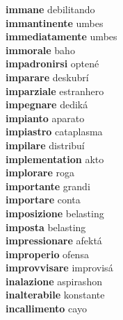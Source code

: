 \textbf{immane } debilitando \\
\textbf{immantinente } umbes \\
\textbf{immediatamente } umbes \\
\textbf{immorale } baho \\
\textbf{impadronirsi } optené \\
\textbf{imparare } deskubrí \\
\textbf{imparziale } estranhero \\
\textbf{impegnare } dediká \\
\textbf{impianto } aparato \\
\textbf{impiastro } cataplasma \\
\textbf{impilare } distribuí \\
\textbf{implementation } akto \\
\textbf{implorare } roga \\
\textbf{importante } grandi \\
\textbf{importare } conta \\
\textbf{imposizione } belasting \\
\textbf{imposta } belasting \\
\textbf{impressionare } afektá \\
\textbf{improperio } ofensa \\
\textbf{improvvisare } improvisá \\
\textbf{inalazione } aspirashon \\
\textbf{inalterabile } konstante \\
\textbf{incallimento } cayo \\
